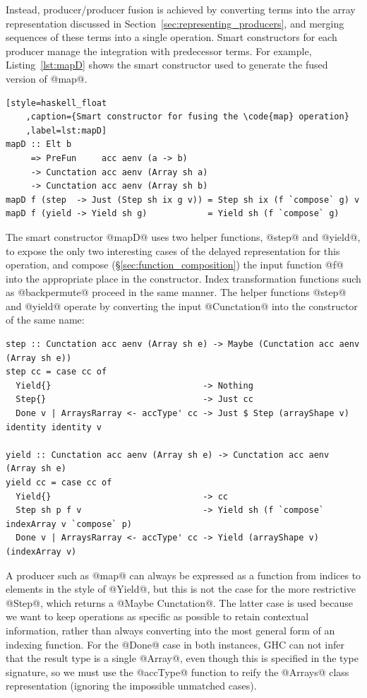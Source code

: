 Instead, producer/producer fusion is achieved by converting terms into the array
representation discussed in Section~\ref{sec:representing_producers}, and
merging sequences of these terms into a single operation. Smart constructors for
each producer manage the integration with predecessor terms. For example,
Listing~\ref{lst:mapD} shows the smart constructor used to generate the fused
version of @map@.

\begin{lstlisting}[style=haskell_float
    ,caption={Smart constructor for fusing the \code{map} operation}
    ,label=lst:mapD]
mapD :: Elt b
     => PreFun     acc aenv (a -> b)
     -> Cunctation acc aenv (Array sh a)
     -> Cunctation acc aenv (Array sh b)
mapD f (step  -> Just (Step sh ix g v)) = Step sh ix (f `compose` g) v
mapD f (yield -> Yield sh g)            = Yield sh (f `compose` g)
\end{lstlisting}

The smart constructor @mapD@ uses two helper functions, @step@ and @yield@, to
expose the only two interesting cases of the delayed representation for this
operation, and compose (\S\ref{sec:function_composition}) the input function @f@
into the appropriate place in the constructor. Index transformation functions
such as @backpermute@ proceed in the same manner. The helper functions @step@
and @yield@ operate by converting the input @Cunctation@ into the constructor of
the same name:
%
\begin{lstlisting}[style=haskell]
step :: Cunctation acc aenv (Array sh e) -> Maybe (Cunctation acc aenv (Array sh e))
step cc = case cc of
  Yield{}                              -> Nothing
  Step{}                               -> Just cc
  Done v | ArraysRarray <- accType' cc -> Just $ Step (arrayShape v) identity identity v

yield :: Cunctation acc aenv (Array sh e) -> Cunctation acc aenv (Array sh e)
yield cc = case cc of
  Yield{}                              -> cc
  Step sh p f v                        -> Yield sh (f `compose` indexArray v `compose` p)
  Done v | ArraysRarray <- accType' cc -> Yield (arrayShape v) (indexArray v)
\end{lstlisting}

A producer such as @map@ can always be expressed as a function from indices to
elements in the style of @Yield@, but this is not the case for the more
restrictive @Step@, which returns a @Maybe Cunctation@. The latter case is used
because we want to keep operations as specific as possible to retain contextual
information, rather than always converting into the most general form of an
indexing function. For the @Done@ case in both instances, GHC can not infer that
the result type is a single @Array@, even though this is specified in the type
signature, so we must use the @accType@ function to reify the @Arrays@ class
representation (ignoring the impossible unmatched cases).

